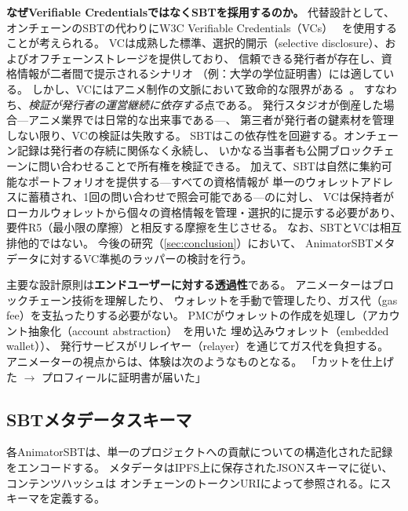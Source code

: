 \textbf{なぜVerifiable CredentialsではなくSBTを採用するのか。}
代替設計として、オンチェーンのSBTの代わりにW3C Verifiable Credentials（VCs）~\cite{sporny2022vc}
を使用することが考えられる。
VCは成熟した標準、選択的開示（selective disclosure）、およびオフチェーンストレージを提供しており、
信頼できる発行者が存在し、資格情報が二者間で提示されるシナリオ
（例：大学の学位証明書）には適している。
しかし、VCにはアニメ制作の文脈において致命的な限界がある~\cite{kakebayashi2023sbt}。
すなわち、\textit{検証が発行者の運営継続に依存する}点である。
発行スタジオが倒産した場合---アニメ業界では日常的な出来事である---、
第三者が発行者の鍵素材を管理しない限り、VCの検証は失敗する。
SBTはこの依存性を回避する。オンチェーン記録は発行者の存続に関係なく永続し、
いかなる当事者も公開ブロックチェーンに問い合わせることで所有権を検証できる。
加えて、SBTは自然に集約可能なポートフォリオを提供する---すべての資格情報が
単一のウォレットアドレスに蓄積され、1回の問い合わせで照会可能である---のに対し、
VCは保持者がローカルウォレットから個々の資格情報を管理・選択的に提示する必要があり、
要件R5（最小限の摩擦）と相反する摩擦を生じさせる。
なお、SBTとVCは相互排他的ではない。
今後の研究（\cref{sec:conclusion}）において、
AnimatorSBTメタデータに対するVC準拠のラッパーの検討を行う。

主要な設計原則は\textbf{エンドユーザーに対する透過性}である。
アニメーターはブロックチェーン技術を理解したり、
ウォレットを手動で管理したり、ガス代（gas fee）を支払ったりする必要がない。
PMCがウォレットの作成を処理し（アカウント抽象化（account abstraction）~\cite{buterin2021erc4337}を用いた
埋め込みウォレット（embedded wallet））、
発行サービスがリレイヤー（relayer）を通じてガス代を負担する。
アニメーターの視点からは、体験は次のようなものとなる。
「カットを仕上げた $\rightarrow$ プロフィールに証明書が届いた」

\subsection{SBTメタデータスキーマ}
\label{subsec:metadata}

各AnimatorSBTは、単一のプロジェクトへの貢献についての構造化された記録をエンコードする。
メタデータはIPFS上に保存されたJSONスキーマに従い、コンテンツハッシュは
オンチェーンのトークンURIによって参照される。にスキーマを定義する。

